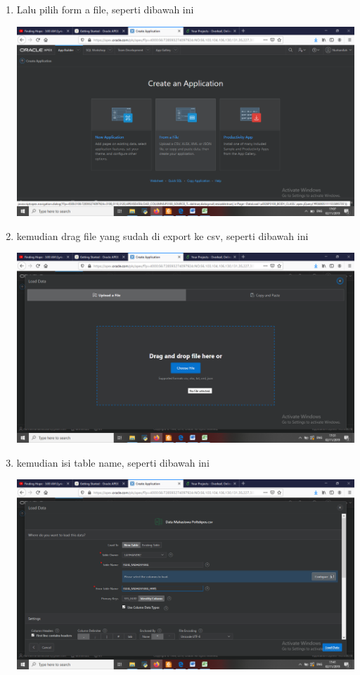 \begin{enumerate}
	\item Lalu pilih form a file, seperti dibawah ini
	\begin{center}
    \includegraphics[scale=0.2]{Apex/11.png}
    \end{center}
    
    \item kemudian drag file yang sudah di export ke csv, seperti dibawah ini
	\begin{center}
    \includegraphics[scale=0.2]{Apex/12.png}
    \end{center}
    
    \item kemudian isi table name, seperti dibawah ini
	\begin{center}
    \includegraphics[scale=0.2]{Apex/13.png}
    \end{center}
    

\end{enumerate}

